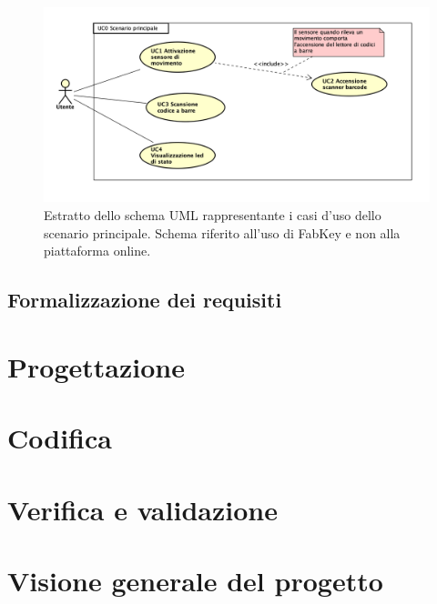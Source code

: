 \begin{figure}[H]
	\begin{center}
	\includegraphics[scale=0.4]{immagini/usecase/scenario_principale.png}
	\caption{Estratto dello schema UML rappresentante i casi d'uso dello scenario principale. Schema riferito all'uso di FabKey e non alla piattaforma online.}
	\end{center}
\end{figure}

\subsection{Formalizzazione dei requisiti}

\section{Progettazione}

\section{Codifica}

\section{Verifica e validazione}

\section{Visione generale del progetto}